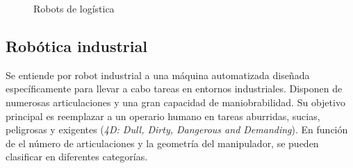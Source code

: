 \begin{figure} [ht!]
    \centering    
    \hspace{1cm}

    \caption{Robots de logística}
\end{figure}


\newpage
\subsection{Robótica industrial}
\label{sec:rob_industrial}
Se entiende por robot industrial a una máquina automatizada diseñada específicamente para llevar a cabo tareas en entornos industriales. 
Disponen de numerosas articulaciones y una gran capacidad de maniobrabilidad. Su objetivo principal es reemplazar a un 
operario humano en tareas aburridas, sucias, peligrosas y exigentes (\textit{4D: Dull, Dirty, Dangerous and Demanding}).
En función de el número de articulaciones y la geometría del manipulador, se pueden clasificar en diferentes categorías.

